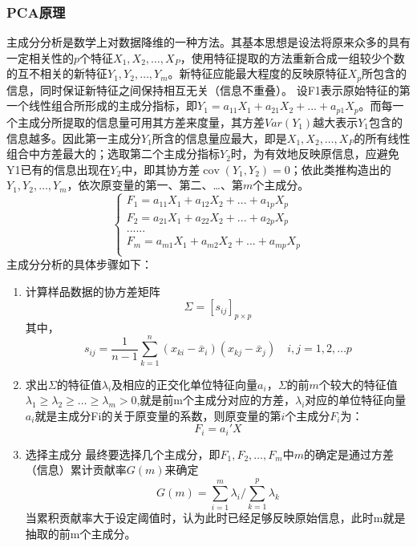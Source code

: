 \subsubsection{PCA原理}
主成分分析是数学上对数据降维的一种方法。其基本思想是设法将原来众多的具有一定相关性的$p$个特征$X_1, X_2, \dots,X_P$，使用特征提取的方法重新合成一组较少个数的互不相关的新特征$Y_1, Y_2,\dots,Y_m$。新特征应能最大程度的反映原特征$X_p$所包含的信息，同时保证新特征之间保持相互无关（信息不重叠）。
设F1表示原始特征的第一个线性组合所形成的主成分指标，即${{Y}_{1}}={{a}_{11}}{{X}_{1}}+{{a}_{21}}{{X}_{2}}+...+{{a}_{p1}}{{X}_{p}}$。而每一个主成分所提取的信息量可用其方差来度量，其方差$Var(Y_1)$越大表示$Y_1$包含的信息越多。因此第一主成分$Y_1$所含的信息量应最大，即是$X_1, X_2, \dots,X_P$的所有线性组合中方差最大的；选取第二个主成分指标$Y_2$时，为有效地反映原信息，应避免Y1已有的信息出现在$Y_2$中，即其协方差$\operatorname{cov}({{Y}_{1}},{{Y}_{2}})=0$；依此类推构造出的$Y_1, Y_2,\dots,Y_m$，依次原变量的第一、第二、…、第$m$个主成分。
\begin{equation}\left\{ \begin{matrix}
   {{F}_{1}}={{a}_{11}}{{X}_{1}}+{{a}_{12}}{{X}_{2}}+...+{{a}_{1p}}{{X}_{p}}  \\
   {{F}_{2}}={{a}_{21}}{{X}_{1}}+{{a}_{22}}{{X}_{2}}+...+{{a}_{2p}}{{X}_{p}}  \\
   ......  \\
   {{F}_{m}}={{a}_{m1}}{{X}_{1}}+{{a}_{m2}}{{X}_{2}}+...+{{a}_{mp}}{{X}_{p}}  \\
\end{matrix} \right.
\end{equation}
主成分分析的具体步骤如下：
\begin{enumerate}
\item 计算样品数据的协方差矩阵
\begin{equation}
\Sigma ={{[{{s}_{ij}}]}_{p\times p}}
\end{equation}
其中，
\begin{equation}
{{s}_{ij}}=\frac{1}{n-1}\sum\limits_{k=1}^{n}{({{x}_{ki}}-{{{\bar{x}}}_{i}})({{x}_{kj}}-{{{\bar{x}}}_{j}})} \quad i,j=1,2,\ldots p
\end{equation}
\item 求出$\Sigma$的特征值${{\lambda }_{i}}$及相应的正交化单位特征向量${{a}_{i}}$，$\Sigma$的前$m$个较大的特征值$\lambda_1\geq \lambda_2\geq \dots\geq \lambda_m>0$,就是前m个主成分对应的方差，${{\lambda }_{i}}$对应的单位特征向量${{a}_{i}}$就是主成分Fi的关于原变量的系数，则原变量的第$i$个主成分$F_i$为：
\begin{equation}
F_i ={{a}_{i}}'X
\end{equation}
\item 选择主成分
    最终要选择几个主成分，即$F_1, F_2,\dots,F_m$中$m$的确定是通过方差（信息）累计贡献率$G(m)$来确定
\begin{equation}
G(m)=\sum\limits_{i=1}^{m}{{{\lambda }_{i}}}/\sum\limits_{k=1}^{p}{{{\lambda }_{k}}}
\end{equation}
当累积贡献率大于设定阈值时，认为此时已经足够反映原始信息，此时m就是抽取的前m个主成分。
\end{enumerate}

